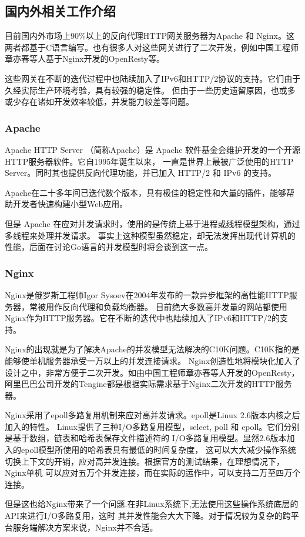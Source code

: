 \documentclass[twoside]{CUGThesis}
\begin{document}
	\subsection{国内外相关工作介绍}
	目前国内外市场上90\%以上的反向代理HTTP网关服务器为Apache 和 Nginx。这两者都基于C语言编写。也有很多人对这些网关进行了二次开发，例如中国工程师章亦春等人基于Nginx开发的OpenResty\cite{OpenResty}等。\par
	这些网关在不断的迭代过程中也陆续加入了IPv6和HTTP/2协议的支持。它们由于久经实际生产环境考验，具有较强的稳定性。
	但由于一些历史遗留原因，也或多或少存在诸如开发效率较低，并发能力较差等问题。
	\subsubsection{Apache}
	Apache HTTP Server （简称Apache）是 Apache 软件基金会维护开发的一个开源HTTP服务器软件。它自1995年诞生以来，
	一直是世界上最被广泛使用的HTTP Server。同时其也提供反向代理功能，并已加入 HTTP/2 和 IPv6 的支持。\par 
	Apache在二十多年间已迭代数个版本，具有极佳的稳定性和大量的插件，能够帮助开发者快速构建小型Web应用。\par
	但是 Apache 在应对并发请求时，使用的是传统上基于进程或线程模型架构，通过多线程来处理并发请求。
	事实上这种模型虽然稳定，却无法发挥出现代计算机的性能，后面在讨论Go语言的并发模型时将会谈到这一点。\par
	\subsubsection{Nginx}
	Nginx是俄罗斯工程师Igor Sysoev在2004年发布的一款异步框架的高性能HTTP服务器，常被用作反向代理和负载均衡器。
	目前绝大多数高并发量的网站都使用Nginx作为HTTP服务器。它在不断的迭代中也陆续加入了IPv6和HTTP/2的支持。\par
	Nginx的出现就是为了解决Apache的并发模型无法解决的C10K问题。C10K指的是能够使单机服务器承受一万以上的并发连接请求。
	Nginx创造性地将模块化加入了设计之中，非常方便于二次开发。如由中国工程师章亦春等人开发的OpenResty，
	阿里巴巴公司开发的Tengine都是根据实际需求基于Nginx二次开发的HTTP服务器。\par
	Nginx采用了epoll多路复用机制来应对高并发请求。epoll是Linux 2.6版本内核之后加入的特性。
	Linux提供了三种I/O多路复用模型，select, poll 和 epoll。它们分别是基于数组，链表和哈希表保存文件描述符的
	I/O多路复用模型。显然2.6版本加入的epoll模型所使用的哈希表具有最低的时间复杂度，
	这可以大大减少操作系统切换上下文的开销，应对高并发连接。根据官方的测试结果，在理想情况下，Nginx单机
	可以应对五万个并发连接，而在实际的运作中，可以支持二万至四万个连接。\par 
	但是这也给Nginx带来了一个问题.在非Linux系统下,无法使用这些操作系统底层的API来进行I/O多路复用，这时
	其并发性能会大大下降。对于情况较为复杂的跨平台服务端解决方案来说，Nginx并不合适。\par
\end{document}
